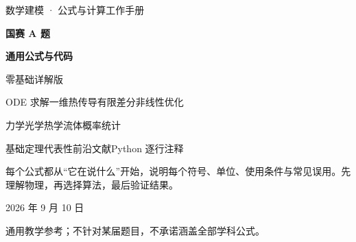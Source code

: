 

\begin{titlepage}
\centering
\vspace*{22mm}
{\large\color{inkblue} 数学建模 · 公式与计算工作手册\par}
\vspace{12mm}
{\Huge\bfseries 国赛 A 题\par}
\vspace{5mm}
{\Huge\bfseries 通用公式与代码\par}
\vspace{10mm}
{\LARGE 零基础详解版\par}
\vspace{16mm}
{\large ODE 求解\quad 一维热传导有限差分\quad 非线性优化\par}
\vspace{4mm}
{\large 力学\quad 光学\quad 热学\quad 流体\quad 概率统计\par}
\vspace{4mm}
{\large 基础定理\quad 代表性前沿文献\quad Python 逐行注释\par}
\vfill
\begin{minipage}{0.82\textwidth}
\large 每个公式都从“它在说什么”开始，说明每个符号、单位、使用条件与常见误用。先理解物理，再选择算法，最后验证结果。
\end{minipage}
\vfill
{\large 2026 年 9 月 10 日\par}
\vspace{5mm}
{\small 通用教学参考；不针对某届题目，不承诺涵盖全部学科公式。\par}
\end{titlepage}
\frontmatter
\tableofcontents
\mainmatter









